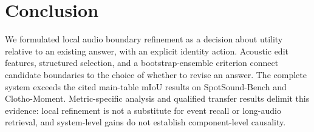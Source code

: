 \section{Conclusion}
We formulated local audio boundary refinement as a decision about utility relative to an existing answer, with an explicit identity action. Acoustic edit features, structured selection, and a bootstrap-ensemble criterion connect candidate boundaries to the choice of whether to revise an answer. The complete system exceeds the cited main-table mIoU results on SpotSound-Bench and Clotho-Moment. Metric-specific analysis and qualified transfer results delimit this evidence: local refinement is not a substitute for event recall or long-audio retrieval, and system-level gains do not establish component-level causality.
